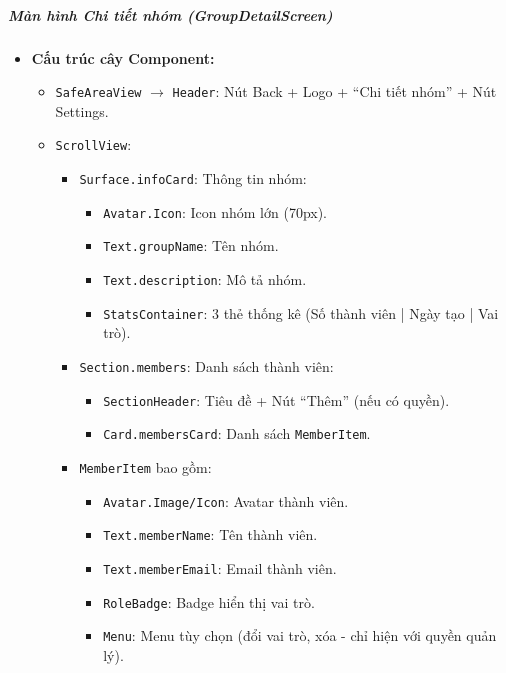 \subparagraph{Màn hình Chi tiết nhóm (GroupDetailScreen)}
\begin{itemize}
    \item \textbf{Cấu trúc cây Component:}
        \begin{itemize}
            \item \texttt{SafeAreaView} $\rightarrow$ \texttt{Header}: Nút Back + Logo + ``Chi tiết nhóm'' + Nút Settings.
            \item \texttt{ScrollView}:
                \begin{itemize}
                    \item \texttt{Surface.infoCard}: Thông tin nhóm:
                        \begin{itemize}
                            \item \texttt{Avatar.Icon}: Icon nhóm lớn (70px).
                            \item \texttt{Text.groupName}: Tên nhóm.
                            \item \texttt{Text.description}: Mô tả nhóm.
                            \item \texttt{StatsContainer}: 3 thẻ thống kê (Số thành viên | Ngày tạo | Vai trò).
                        \end{itemize}
                    \item \texttt{Section.members}: Danh sách thành viên:
                        \begin{itemize}
                            \item \texttt{SectionHeader}: Tiêu đề + Nút ``Thêm'' (nếu có quyền).
                            \item \texttt{Card.membersCard}: Danh sách \texttt{MemberItem}.
                        \end{itemize}
                    \item \texttt{MemberItem} bao gồm:
                        \begin{itemize}
                            \item \texttt{Avatar.Image/Icon}: Avatar thành viên.
                            \item \texttt{Text.memberName}: Tên thành viên.
                            \item \texttt{Text.memberEmail}: Email thành viên.
                            \item \texttt{RoleBadge}: Badge hiển thị vai trò.
                            \item \texttt{Menu}: Menu tùy chọn (đổi vai trò, xóa - chỉ hiện với quyền quản lý).

\end{itemize}
\end{itemize}
\end{itemize}
\end{itemize}
